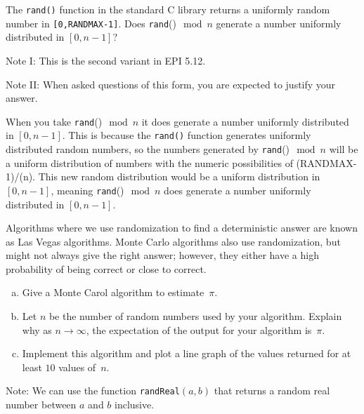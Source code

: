 \documentclass{article}
\begin{document}
\nextprob
The \texttt{rand()} function in the standard C library returns a
uniformly random number in \texttt{[0,RANDMAX-1]}. Does \texttt{rand}()$\mod n$
generate a number uniformly distributed in $[0,n-1]$?

Note I: This is the second variant in EPI 5.12.

Note II: When asked questions of this form, you are expected to justify your
answer.

When you take \texttt{rand}()$\mod n$ it does  generate a number uniformly distributed in $[0,n-1]$. This is because the \texttt{rand()} function generates uniformly distributed random numbers, so the numbers generated by \texttt{rand}()$\mod n$ will be a uniform distribution of numbers with the numeric possibilities of (RANDMAX-1)/(n). This new random distribution would be a uniform distribution in $[0,n-1]$, meaning \texttt{rand}()$\mod n$ does  generate a number uniformly distributed in $[0,n-1]$.


\nextprob

Algorithms where we use randomization to find a deterministic answer are known
as Las Vegas algorithms.  Monte Carlo algorithms also use randomization, but
might not always give the right answer; however, they either have a high
probability of being correct or close to correct.

\begin{enumerate}[(a)]
    \item Give a Monte Carol algorithm to estimate~$\pi$.
    \item Let $n$ be the number of random numbers used by your algorithm.
        Explain why as $n \to \infty$, the expectation of the output for your
        algorithm is~$\pi$.
    \item Implement this algorithm and plot a line graph of
        the values returned for at least $10$ values of~$n$.
\end{enumerate}

Note: We can use the function \texttt{randReal}$(a,b)$ that returns a random
real number between $a$ and $b$ inclusive.
\end{document}
